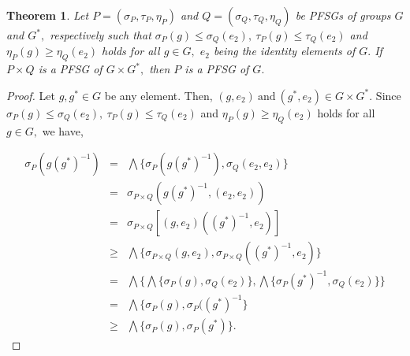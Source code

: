 \documentclass[12pt,letterpaper]{amsart}
\theoremstyle{plain}
\newtheorem{theorem}{Theorem}[section]
\theoremstyle{definition}
\numberwithin{equation}{section}
\begin{document}
\begin{theorem} \label{c}
Let $P = (\sigma_P, \tau_P, \eta_P)$ and $Q = (\sigma_Q, \tau_Q, \eta_Q)$ be PFSGs of groups $G$ and $G^{*},$ respectively such that $\sigma_P(g) \leq \sigma_Q(e_2),~ \tau_P(g) \leq \tau_Q(e_2)$ and $\eta_P(g) \geq \eta_Q(e_2)$ holds for all $g \in G,$ $e_2$ being the identity elements of $G.$ If $P \times Q$ is a PFSG of $G \times G^*,$ then $P$ is a PFSG of $G.$
\end{theorem}

\begin{proof}
Let $g, g^* \in G$ be any element. Then, $(g, e_2)~ \text{and}~ (g^*, e_2) \in G \times G^*.$ Since $\sigma_P(g) \leq \sigma_Q(e_2),~ \tau_P(g) \leq \tau_Q(e_2)$ and $\eta_P(g) \geq \eta_Q(e_2)$ holds for all $g \in G,$ we have, 

\begin{eqnarray*}
\sigma_P(g (g^*)^{-1}) & = & \bigwedge \lbrace \sigma_P(g (g^*)^{-1}), \sigma_Q(e_2, e_2) \rbrace\\
& = & \sigma_{P \times Q}(g (g^*)^{-1}, (e_2, e_2))\\
& = & \sigma_{P \times Q}[(g, e_2)((g^*)^{-1}, e_2)]\\
& \geq & \bigwedge \lbrace \sigma_{P \times Q}(g, e_2), \sigma_{P \times Q}((g^*)^{-1}, e_2) \rbrace\\
& = & \bigwedge \lbrace \bigwedge\lbrace \sigma_P(g), \sigma_Q(e_2)\rbrace, \bigwedge\lbrace \sigma_P(g^*)^{-1}, \sigma_Q(e_2) \rbrace \rbrace\\
& = & \bigwedge\lbrace \sigma_P(g), \sigma_P((g^*)^{-1} \rbrace\\
& \geq & \bigwedge\lbrace \sigma_P(g), \sigma_P(g^*) \rbrace. 
\end{eqnarray*}


\end{proof}
\end{document}
